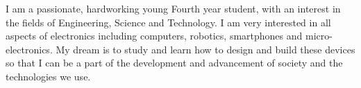 

I am a passionate, hardworking young Fourth year student, with an  interest in the fields of Engineering, Science and Technology.  
I am very interested in all aspects of electronics including computers,  robotics, smartphones and micro-electronics.  
My dream is to study and learn how to design and build these devices so  that I can be a part of the development and advancement of society and  the technologies we use.


